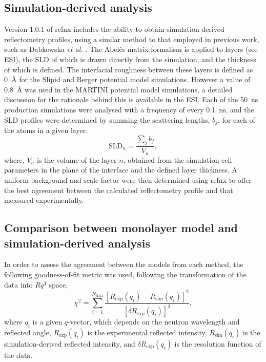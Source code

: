 \documentclass[amsmath,amssymb,twocolumn,superscriptaddress,aps,prl]{revtex4-1}
\begin{document}
\subsection{Simulation-derived analysis}
Version 1.0.1 of refnx \cite{Nelson2018,refnx} includes the ability to obtain simulation-derived reflectometry profiles, using a similar method to that employed in previous work, such as Dabkowska \emph{et al.} \cite{Dabkowska2014}.
The Abel\`{e}s matrix formalism is applied to layers (see ESI), the SLD of which is drawn directly from the simulation, and the thickness of which is defined.
The interfacial roughness between these layers is defined as \SI{0}{\angstrom} for the Slipid and Berger potential model simulations.
However a value of \SI{0.8}{\angstrom} was used in the MARTINI potential model simulations, a detailed discussion for the rationale behind this is available in the ESI.
Each of the \SI{50}{\nano\second} production simulations were analysed with a frequency of every \SI{0.1}{\nano\second}, and the SLD profiles were determined by summing the scattering lengths, $b_j$, for each of the atoms in a given layer.
%
\begin{equation}
  \text{SLD}_n = \frac{\sum_j{b_j}}{V_n},
\end{equation}
%
where, $V_n$ is the volume of the layer $n$, obtained from the simulation cell parameters in the plane of the interface and the defined layer thickness.
A uniform background and scale factor were then determined using refnx to offer the best agreement between the calculated reflectometry profile and that measured experimentally.

\subsection{Comparison between monolayer model and simulation-derived analysis}
\label{sec:para}
In order to assess the agreement between the models from each method, the following goodness-of-fit metric was used, following the transformation of the data into $Rq^4$ space,
%
\begin{equation}
  \chi^2 = \sum_{i=1}^{N_{\text{data}}} \frac{[R_{\text{exp}}(q_i) - R_{\text{sim}}(q_i)]^2}{[\delta R_{\text{exp}}(q_i)]^2},
\end{equation}
%
where $q_i$ is a given $q$-vector, which depends on the neutron wavelength and reflected angle, $R_{\text{exp}}(q_i)$ is the experimental reflected intensity, $R_{\text{sim}}(q_i)$ is the simulation-derived reflected intensity, and $\delta R_{\text{exp}}(q_i)$ is the resolution function of the data.
\end{document}
